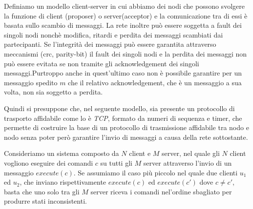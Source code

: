 	
	Definiamo un modello client-server in cui abbiamo dei nodi che possono svolgere la funzione di client (proposer) o server(acceptor) e la comunicazione tra di essi è basata sullo scambio di messaggi. La rete inoltre può essere soggetta a fault dei singoli nodi nonchè modifica, ritardi e perdita dei messaggi scambiati dai partecipanti. Se l'integrità dei messaggi può essere garantita attraverso meccanismi (crc, parity-bit) il fault dei singoli nodi e la perdita dei messaggi non può essere evitata se non tramite gli acknowledgement dei singoli messaggi.Purtroppo anche in quest'ultimo caso non è possibile garantire per un messaggio spedito $m$ che il relativo acknowledgement, che è un messaggio a sua volta, non sia soggetto a perdita.
	
	
	
	Quindi si presuppone che, nel seguente modello, sia presente un protocollo di trasporto affidabile come lo è \textit{TCP}, formato da numeri di sequenza e timer, che permette di costruire la base di un protocollo di trasmissione affidabile tra nodo e nodo senza poter però garantire l'invio di messaggi a causa della rete sottostante.
	

	
	Consideriamo un sistema composto da $N$ client e $M$ server, nel quale gli $N$ client vogliono eseguire dei comandi $c$ su tutti gli $M$ server attraverso l'invio di un messaggio $execute(c)$. Se assumiamo il caso più piccolo nel quale due clienti $u_1$ ed $u_2$, che inviano rispettivamente $execute(c)$ ed $execute(c')$ dove $c\not=c'$, basta che uno solo tra gli $M$ server riceva i comandi nel'ordine sbagliato per produrre stati inconsistenti.
	
	\iffalse 
	Theorem 15.7: Se consideriamo il sistema formato da n client ed m server nel modello che prevede ritardi di messaggio, se uno degli m server riceve i comandi nel'ordine sbagliato può produrre stati inconsistenti.
	
	Dimostrazione: Assumiamo di avere due clienti $u_1$ ed $u_2$ e due server $s_1$ e $s_2$. Entrami i client invocano il comando di aggiornare una variabile $x$ su un server, inizializzata $x\equiv0$. Il client $u_1$ invia il comando $x = x + 1$ e il client $u_2$ invia $x = 2 · x$.
	I client inviano il messaggio allo stesso momento ma a causa del modello (che può essere determinato dalla diversità nella posizione geografica dei nodi) $s_1$ riceve prima il messaggio da $s_1$ e poi da $s_2$ raggingendo lo stato finale con $x = (0 + 1) · 2 = 2$ e $s_2$ invece il contrario computando $x = (0 · 2) + 1 = 1$;
	\fi
	
